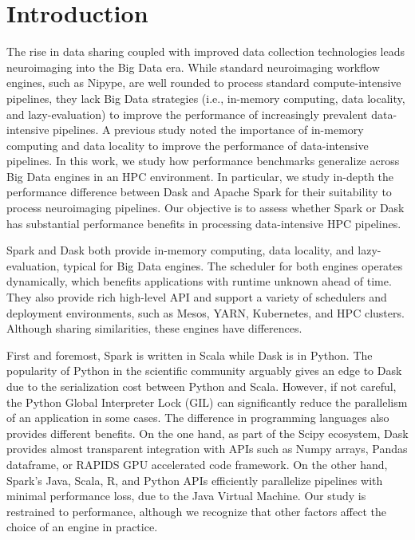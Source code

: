\documentclass[AMA,STIX1COL]{WileyNJD-v2}
\begin{document}
\section{Introduction}
The rise in data sharing coupled with improved data collection technologies leads neuroimaging into the Big Data era\cite{ALFAROALMAGRO2018400, van2014human, ConpPortal}.
While standard neuroimaging workflow engines, such as Nipype\cite{Nipype:11}, are well rounded to process standard compute-intensive pipelines,
they lack Big Data strategies (i.e., in-memory computing, data locality, and lazy-evaluation) to improve the performance of increasingly prevalent data-intensive pipelines.
A previous study\cite{8752675} noted the importance of in-memory computing and data locality to improve the performance of data-intensive pipelines.
In this work, we study how performance benchmarks generalize across Big Data engines in an HPC environment.
In particular, we study in-depth the performance difference between Dask\cite{Dask:15} and Apache Spark\cite{Spark:16} for their suitability to process neuroimaging pipelines.
Our objective is to assess whether Spark or Dask has substantial performance benefits in processing data-intensive HPC pipelines.

Spark and Dask both provide in-memory computing, data locality, and lazy-evaluation, typical for Big Data engines.
The scheduler for both engines operates dynamically, which benefits applications with runtime unknown ahead of time\cite{Dask:15}.
They also provide rich high-level API and support a variety of schedulers and deployment environments, such as Mesos\cite{hindman2011mesos}, YARN\cite{vavilapalli2013apache}, Kubernetes, and HPC clusters.
Although sharing similarities, these engines have differences.

First and foremost, Spark is written in Scala while Dask is in Python.
The popularity of Python in the scientific community arguably gives an edge to Dask due to the serialization cost between Python and Scala.
However, if not careful, the Python Global Interpreter Lock (GIL) can significantly reduce the parallelism of an application in some cases.
The difference in programming languages also provides different benefits.
On the one hand, as part of the Scipy ecosystem, Dask provides almost transparent integration with APIs such as Numpy arrays, Pandas dataframe, or RAPIDS GPU accelerated code framework.
On the other hand, Spark's Java, Scala, R, and Python APIs efficiently parallelize pipelines with minimal performance loss, due to the Java Virtual Machine.
Our study is restrained to performance, although we recognize that other factors affect the choice of an engine in practice.
\end{document}

